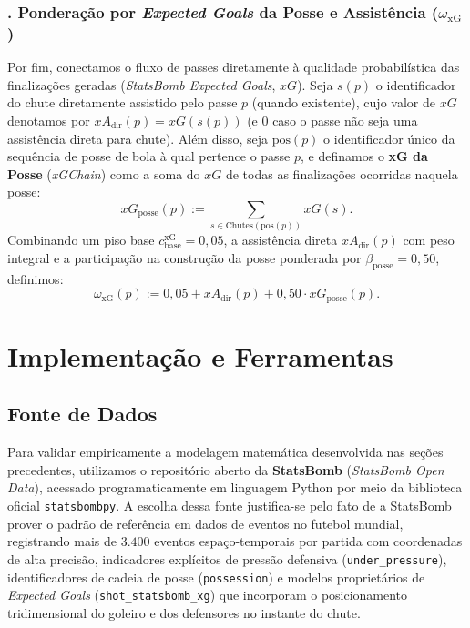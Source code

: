 \documentclass[10pt,a4paper]{article}
\theoremstyle{definition}
\theoremstyle{plain}
\theoremstyle{remark}
\begin{document}
\subsubsection*{. Ponderação por \textit{Expected Goals} da Posse e Assistência (\texorpdfstring{$\omega_{\text{xG}}$}{w\_xG})}
Por fim, conectamos o fluxo de passes diretamente à qualidade probabilística das finalizações geradas (\textit{StatsBomb Expected Goals}, $xG$). Seja $s(p)$ o identificador do chute diretamente assistido pelo passe $p$ (quando existente), cujo valor de $xG$ denotamos por $xA_{\text{dir}}(p) = xG(s(p))$ (e $0$ caso o passe não seja uma assistência direta para chute). Além disso, seja $\text{pos}(p)$ o identificador único da sequência de posse de bola à qual pertence o passe $p$, e definamos o \textbf{xG da Posse} (\textit{xGChain}) como a soma do $xG$ de todas as finalizações ocorridas naquela posse:
\[
xG_{\text{posse}}(p) := \sum_{s \in \text{Chutes}(\text{pos}(p))} xG(s).
\]
Combinando um piso base $c_{\text{base}}^{\text{xG}} = 0{,}05$, a assistência direta $xA_{\text{dir}}(p)$ com peso integral e a participação na construção da posse ponderada por $\beta_{\text{posse}} = 0{,}50$, definimos:
\begin{equation}
\omega_{\text{xG}}(p) := 0{,}05 + xA_{\text{dir}}(p) + 0{,}50 \cdot xG_{\text{posse}}(p).
\label{eq:peso_xg}
\end{equation}

\section{\sffamily Implementação e Ferramentas}

\subsection{\sffamily Fonte de Dados}

Para validar empiricamente a modelagem matemática desenvolvida nas seções precedentes, utilizamos o repositório aberto da \textbf{StatsBomb} (\textit{StatsBomb Open Data}), acessado programaticamente em linguagem Python por meio da biblioteca oficial \texttt{statsbombpy}. A escolha dessa fonte justifica-se pelo fato de a StatsBomb prover o padrão de referência em dados de eventos no futebol mundial, registrando mais de $3.400$ eventos espaço-temporais por partida com coordenadas de alta precisão, indicadores explícitos de pressão defensiva (\texttt{under\_pressure}), identificadores de cadeia de posse (\texttt{possession}) e modelos proprietários de \textit{Expected Goals} (\texttt{shot\_statsbomb\_xg}) que incorporam o posicionamento tridimensional do goleiro e dos defensores no instante do chute.
\end{document}
